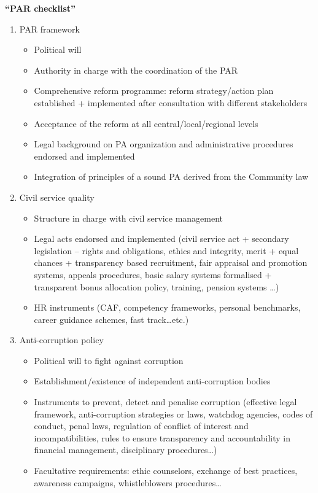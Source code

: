 {\bf “PAR checklist”}
\begin{enumerate}
\item PAR framework 
\begin{itemize}
\item Political will
\item Authority in charge with the coordination of the PAR
\item Comprehensive reform programme: reform strategy/action plan established + implemented after consultation with different stakeholders
\item Acceptance of the reform at all central/local/regional levels
\item Legal background on PA organization and administrative procedures endorsed and implemented
\item Integration of principles of a sound PA derived from the Community law
\end{itemize}
\item Civil service quality
\begin{itemize}
\item Structure in charge with civil service management
\item Legal acts endorsed and implemented (civil service act + secondary legislation – rights and obligations, ethics and integrity, merit + equal chances + transparency based recruitment, fair appraisal and promotion systems, appeals procedures, basic salary systems formalised + transparent bonus allocation policy, training, pension systems …)
\item HR instruments (CAF, competency frameworks, personal benchmarks, career guidance schemes, fast track…etc.)
\end{itemize}
\item Anti-corruption policy
\begin{itemize}
\item Political will to fight against corruption
\item Establishment/existence of independent anti-corruption bodies
\item Instruments to prevent, detect and penalise corruption (effective legal framework, anti-corruption strategies or laws, watchdog agencies, codes of conduct, penal laws, regulation of conflict of interest and incompatibilities, rules to ensure transparency and accountability in financial management, disciplinary procedures…)
\item Facultative requirements: ethic counselors, exchange of best practices, awareness campaigns, whistleblowers procedures…

\end{itemize}
\end{enumerate}
